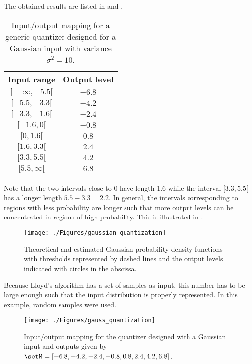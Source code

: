 The obtained results are listed in  and .

\begin{table}
\centering
\caption{Input/output mapping for a generic quantizer designed for a Gaussian input with variance $\sigma^2=10$.\label{tab:gaussian_quantizer}}
\begin{tabular}{|c|c|}
\hline
Input range  & Output level \\ \hline
$]- \infty, -5.5[$ & $-6.8$ \\ \hline
$[-5.5, -3.3[$ & $-4.2$ \\ \hline
$[-3.3, -1.6[$ & $-2.4$ \\ \hline
$[-1.6, 0[$ & $-0.8$ \\ \hline
$[0, 1.6[$ & $0.8$ \\ \hline
$[1.6, 3.3[$ & $2.4$ \\ \hline
$[3.3, 5.5[$ & $4.2$ \\ \hline
$[5.5, \infty[$ & $6.8$ \\ \hline
\end{tabular}
\end{table}

Note that the two intervals close to 0 have length 1.6 while the interval $[3.3, 5.5[$ has a longer length $5.5-3.3=2.2$. In general, the
intervals corresponding to regions with less probability are longer such that more output levels can be concentrated in
regions of high probability.
This is illustrated in .

\begin{figure}
\centering
\texttt{[image: ./Figures/gaussian\_quantization]}
\caption{Theoretical and estimated Gaussian probability density functions with thresholds represented by dashed lines and the output levels indicated with circles in the abscissa.\label{fig:gaussian_quantization}}
\end{figure}

Because Lloyd's algorithm has a set of samples as input, this number has to be large enough such that the
input distribution is properly represented. In this example,  random samples were used.

\begin{figure}
\centering
\texttt{[image: ./Figures/gauss\_quantization]}
\caption{Input/output mapping for the quantizer designed with a Gaussian input and outputs given by $\setM=[-6.8, -4.2, -2.4, -0.8, 0.8, 2.4, 4.2, 6.8]$.\label{fig:gauss_quantization}}
\end{figure}

